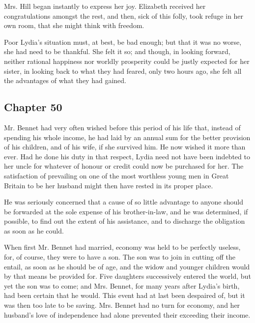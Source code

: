 Mrs. Hill began instantly to express her joy. Elizabeth received her congratulations amongst the rest, and then, sick of this folly, took refuge in her own room, that she might think with freedom.

Poor Lydia's situation must, at best, be bad enough; but that it was no worse, she had need to be thankful. She felt it so; and though, in looking forward, neither rational happiness nor worldly prosperity could be justly expected for her sister, in looking back to what they had feared, only two hours ago, she felt all the advantages of what they had gained.

\subsection[chapter-50]{\useURL[url50][][][]\from[url50] Chapter 50}

Mr. Bennet had very often wished before this period of his life that, instead of spending his whole income, he had laid by an annual sum for the better provision of his children, and of his wife, if she survived him. He now wished it more than ever. Had he done his duty in that respect, Lydia need not have been indebted to her uncle for whatever of honour or credit could now be purchased for her. The satisfaction of prevailing on one of the most worthless young men in Great Britain to be her husband might then have rested in its proper place.

He was seriously concerned that a cause of so little advantage to anyone should be forwarded at the sole expense of his brother-in-law, and he was determined, if possible, to find out the extent of his assistance, and to discharge the obligation as soon as he could.

When first Mr. Bennet had married, economy was held to be perfectly useless, for, of course, they were to have a son. The son was to join in cutting off the entail, as soon as he should be of age, and the widow and younger children would by that means be provided for. Five daughters successively entered the world, but yet the son was to come; and Mrs. Bennet, for many years after Lydia's birth, had been certain that he would. This event had at last been despaired of, but it was then too late to be saving. Mrs. Bennet had no turn for economy, and her husband's love of independence had alone prevented their exceeding their income.


